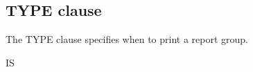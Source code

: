 \subsection{TYPE clause}

The TYPE clause specifies when to print a report group.

\begin{syntax}
   IS
  \begin{1=}
    \begin{1=}
      \begin{1=}
          \\
      \end{1=} \\
      \begin{1=}
          \\
      \end{1=}
    \end{1=}
    \begin{1=}
      \identifier \\
    \end{1=}
    \begin{0-1}
       
    \end{0-1} \\

    \begin{1=}
       \\
    \end{1=} \\

    \begin{1=}
        \\
    \end{1=} \\

    \begin{1=}
        \\
    \end{1=} \\

    \begin{1=}
        \\
    \end{1=} \\

    \begin{1=}
        \\
    \end{1=}
  \end{1=}
\end{syntax}

